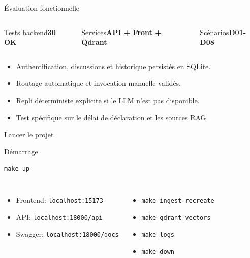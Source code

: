 \documentclass[aspectratio=169]{beamer}
\newcommand{\metricbox}[2]{%
  \begin{block}{#1}\centering\Large\textbf{#2}\end{block}%
}
\begin{document}
\begin{frame}{Évaluation fonctionnelle}
  \begin{columns}[T]
      \metricbox{Tests backend}{30 OK}
      \metricbox{Services}{API + Front + Qdrant}
      \metricbox{Scénarios}{D01-D08}
  \end{columns}

  \vspace{0.6em}
  \begin{itemize}
    \item Authentification, discussions et historique persistés en SQLite.
    \item Routage automatique et invocation manuelle validés.
    \item Repli déterministe explicite si le LLM n'est pas disponible.
    \item Test spécifique sur le délai de déclaration et les sources RAG.
  \end{itemize}
\end{frame}

\begin{frame}[fragile]{Lancer le projet}
  \begin{block}{Démarrage}
\begin{verbatim}
make up
\end{verbatim}
  \end{block}

  \begin{columns}[T]
      \begin{itemize}
        \item Frontend: \texttt{localhost:15173}
        \item API: \texttt{localhost:18000/api}
        \item Swagger: \texttt{localhost:18000/docs}
      \end{itemize}
      \begin{itemize}
        \item \texttt{make ingest-recreate}
        \item \texttt{make qdrant-vectors}
        \item \texttt{make logs}
        \item \texttt{make down}
      \end{itemize}
  \end{columns}
\end{frame}
\end{document}
